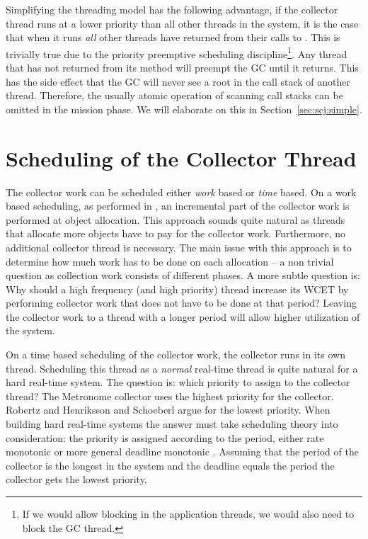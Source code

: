 Simplifying the threading model has the following advantage, if the
collector thread runs at a lower priority than all other threads in
the system, it is the case that when it runs \emph{all} other threads
have returned from their calls to . This is trivially
true due to the priority preemptive scheduling discipline\footnote{If
we would allow blocking in the application threads, we would also
need to block the GC thread.}. Any thread that has not returned from
its  method will preempt the GC until it returns. This
has the side effect that the GC will never see a root in the call
stack of another thread. Therefore, the usually atomic operation of
scanning call stacks can be omitted in the mission phase. We will
elaborate on this in Section~\ref{sec:scj:simple}.


\section{Scheduling of the Collector Thread}
\label{sec:gcsched}

The collector work can be scheduled either \emph{work} based or
\emph{time} based. On a work based scheduling, as performed in
\cite{gc:siebert:phd}, an incremental part of the collector work is
performed at object allocation. This approach sounds quite natural
as threads that allocate more objects have to pay for the collector
work. Furthermore, no additional collector thread is necessary. The
main issue with this approach is to determine how much work has to
be done on each allocation -- a non trivial question as collection
work consists of different phases. A more subtle question is: Why
should a high frequency (and high priority) thread increase its WCET
by performing collector work that does not have to be done at that
period? Leaving the collector work to a thread with a longer period
will allow higher utilization of the system.

On a time based scheduling of the collector work, the collector runs
in its own thread. Scheduling this thread as a \emph{normal}
real-time thread is quite natural for a hard real-time system. The
question is: which priority to assign to the collector thread? The
Metronome collector \cite{gc:bacon03} uses the highest priority for
the collector. Robertz and Henriksson \cite{780745} and Schoeberl
\cite{jop:rtgc_sched} argue for the lowest priority. When building
hard real-time systems the answer must take scheduling theory into
consideration: the priority is assigned according to the period,
either rate monotonic \cite{321743} or more general deadline
monotonic \cite{Audsley-etal91}. Assuming that the period of the
collector is the longest in the system and the deadline equals the
period the collector gets the lowest priority.


